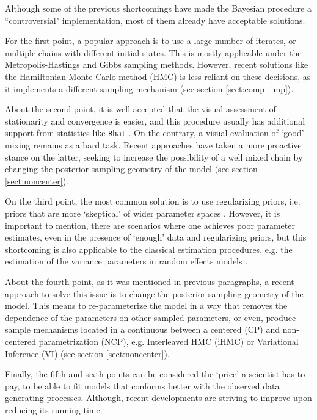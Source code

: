 Although some of the previous shortcomings have made the Bayesian procedure a ``controversial" implementation, most of them already have acceptable solutions. 

For the first point, a popular approach is to use a large number of iterates, or multiple chains with different initial states. This is mostly applicable under the Metropolis-Hastings and Gibbs sampling methods. However, recent solutions like the Hamiltonian Monte Carlo method (HMC) \cite{Betancourt_et_al_2013} is less reliant on these decisions, as it implements a different sampling mechanism (see section \ref{sect:comp_imp}). 

About the second point, it is well accepted that the visual assessment of stationarity and convergence is easier, and this procedure usually has additional support from statistics like \texttt{Rhat} \cite{Gelman_et_al_2014}. On the contrary, a visual evaluation of `good' mixing remains as a hard task. Recent approaches have taken a more proactive stance on the latter, seeking to increase the possibility of a well mixed chain by changing the posterior sampling geometry of the model \cite{Papaspiliopoulos_et_al_2003, Papaspiliopoulos_et_al_2007, Betancourt_et_al_2013, McElreath_2020} (see section \ref{sect:noncenter}).

On the third point, the most common solution is to use regularizing priors, i.e. priors that are more `skeptical' of wider parameter spaces \cite{McElreath_2020}. However, it is important to mention, there are scenarios where one achieves poor parameter estimates, even in the presence of `enough' data and regularizing priors, but this shortcoming is also applicable to the classical estimation procedures, e.g. the estimation of the variance parameters in random effects models \cite{Skrondal_et_al_2004a}.

About the fourth point, as it was mentioned in previous paragraphs, a recent approach to solve this issue is to change the posterior sampling geometry of the model. This means to re-parameterize the model in a way that removes the dependence of the parameters on other sampled parameters, or even, produce sample mechanisms located in a continuous between a centered (CP) and non-centered parametrization (NCP), e.g. Interleaved HMC (iHMC) or Variational Inference (VI) \cite{Gelfand_et_al_1995, Gelfand_et_al_1996, Papaspiliopoulos_et_al_2003, Papaspiliopoulos_et_al_2007, Betancourt_et_al_2013, Gorinova_et_al_2019} (see section \ref{sect:noncenter}).

Finally, the fifth and sixth points can be considered the `price' a scientist has to pay, to be able to fit models that conforms better with the observed data generating processes. Although, recent developments are striving to improve upon reducing its running time.

